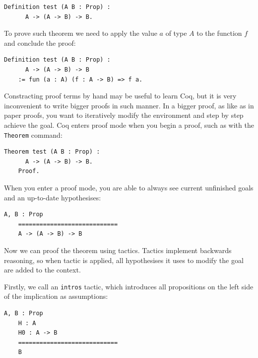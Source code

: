 \vspace{0.5cm}
\begin{lstlisting}[language=coq]
    Definition test (A B : Prop) :
      A -> (A -> B) -> B.
\end{lstlisting}

To prove such theorem we need to apply the value $a$ of type $A$ to the function $f$ and conclude the proof:

\vspace{0.5cm}
\begin{lstlisting}[language=coq]
    Definition test (A B : Prop) :
      A -> (A -> B) -> B
    := fun (a : A) (f : A -> B) => f a.
\end{lstlisting}

Constracting proof terms by hand may be useful to learn Coq, but it is very inconvenient to write bigger proofs in such manner. In a bigger proof, as like as in paper proofs, you want to iteratively modify the environment and step by step achieve the goal. Coq enters proof mode when you begin a proof, such as with the \texttt{Theorem} command: 

\vspace{0.5cm}
\begin{lstlisting}[language=coq]
    Theorem test (A B : Prop) :
      A -> (A -> B) -> B.
    Proof.
\end{lstlisting}

When you enter a proof mode, you are able to always see current unfinished goals and an up-to-date hypothesises: 

\vspace{0.5cm}
\begin{lstlisting}[language=coq]
    A, B : Prop
    ============================
    A -> (A -> B) -> B
\end{lstlisting}

Now we can proof the theorem using tactics. Tactics implement backwards reasoning, so when tactic is applied, all hypothesises it uses to modify the goal are added to the context. 

Firstly, we call an \texttt{intros} tactic, which introduces all propositions on the left side of the implication as assumptions: 

\vspace{0.5cm}
\begin{lstlisting}[language=coq]
    A, B : Prop
    H : A
    H0 : A -> B
    ============================
    B
\end{lstlisting}

